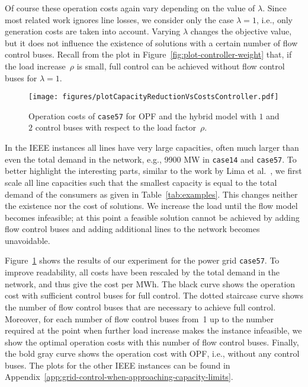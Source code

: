 \documentclass{article}[11pt,a4paper]
\newcommand{\plotscaleOne}{0.45}
\begin{document}
Of course these operation costs again vary depending on the value of
$\lambda$.  Since most related work ignores line losses, we consider
only the case $\lambda = 1$, i.e., only generation costs are taken
into account.  Varying $\lambda$ changes the objective value, but it
does not influence the existence of solutions with a certain number of
flow control buses.  Recall from the plot in
Figure~\ref{fig:plot-controller-weight} that, if the load
increase~$\rho$ is small, full control can be achieved without flow
control buses for $\lambda=1$.
\begin{figure}[tb!]
  	\centering
    	\texttt{[image: figures/plotCapacityReductionVsCostsController.pdf]}
	\caption{Operation costs of \texttt{case57} for OPF and the
          hybrid model with $1$ and $2$ control buses with respect to
          the load factor~$\rho$.}
	\label{fig:plot-capacity-cost-controller}
\end{figure}
In the IEEE instances all lines have very large capacities, often much
larger than even the total demand in the network, e.g., 9900 MW in
\texttt{case14} and \texttt{case57}.  To better highlight the
interesting parts, similar to the work by Lima et
al.~\cite{lgkm-psp-03}, we first scale all line capacities such that
the smallest capacity is equal to the total demand of the consumers as
given in Table~\ref{tab:examples}.  This changes neither the existence
nor the cost of solutions.  We increase the load until the flow model
becomes infeasible; at this point a feasible solution cannot be
achieved by adding flow control buses and adding additional lines to
the network becomes unavoidable.

Figure~\ref{fig:plot-capacity-cost-controller} shows the results of
our experiment for the power grid \texttt{case57}.  To improve
readability, all costs have been rescaled by the total demand in the
network, and thus give the cost per MWh.  The black curve shows the
operation cost with sufficient control buses for full control.  The
dotted staircase curve shows the number of flow control buses that are
necessary to achieve full control.  Moreover, for each number of flow
control buses from~1 up to the number required at the point when
further load increase makes the instance infeasible, we show the
optimal operation costs with this number of flow control buses.
Finally, the bold gray curve shows the operation cost with OPF, i.e.,
without any control buses.  The plots for the other IEEE
instances can be found in
Appendix~\ref{app:grid-control-when-approaching-capacity-limits}.
\end{document}
